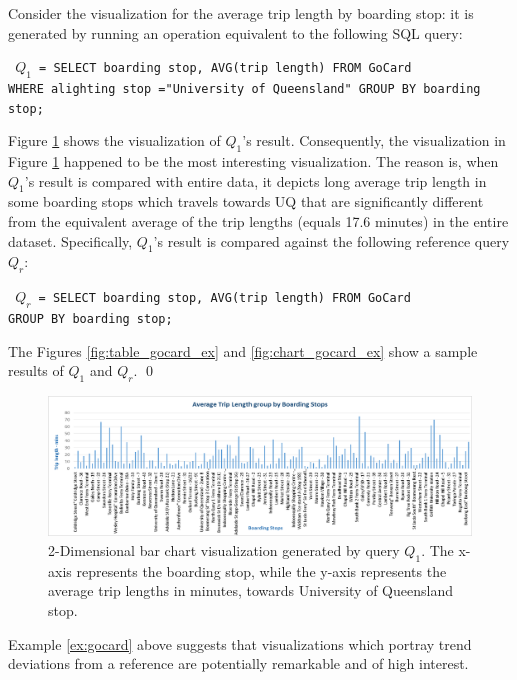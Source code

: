 \begin{example}
Consider the visualization for the average trip length by boarding stop: it is generated by running an operation equivalent to the following SQL query:
%
\begin{center} 
\texttt{ $Q_1$ = SELECT boarding stop, AVG(trip length)  FROM GoCard 
\\ WHERE alighting stop ="University of Queensland"  GROUP BY boarding stop; } 
\end{center}
%
Figure \ref{fig:q1_vis} shows the visualization of $Q_1$'s result.
%
Consequently, the visualization in Figure \ref{fig:q1_vis} happened to be the most interesting visualization.
%
The reason is, when $Q_1$'s result is compared with entire data, it depicts long average trip length in some boarding stops which travels towards UQ that are significantly different from the equivalent average of the trip lengths (equals 17.6 minutes) in the entire dataset.
%
Specifically, $Q_1$'s result is compared against the following reference query $Q_r$:
%
\begin{center} 
\texttt{ $Q_r$ = SELECT boarding stop, AVG(trip length)  FROM GoCard 
\\  GROUP BY boarding stop; } 
\end{center}
%
The Figures \ref{fig:table_gocard_ex} and \ref{fig:chart_gocard_ex} show a sample results of $Q_1$ and $Q_r$.
%
\qed
\end{example}
%
%
%
%
%
%
%
%
\begin{figure}[t] 
	\centering
	\includegraphics[width=\textwidth]{example.png}
 	\caption{2-Dimensional bar chart visualization generated by query $Q_1$. The x-axis represents the boarding stop, while the y-axis represents the average trip lengths in minutes, towards University of Queensland stop.}
	\label{fig:q1_vis}
\end{figure}
%
%
%
%
%
%
%
Example \ref{ex:gocard} above suggests that visualizations which portray trend deviations from a reference are potentially remarkable and of high interest.
%

